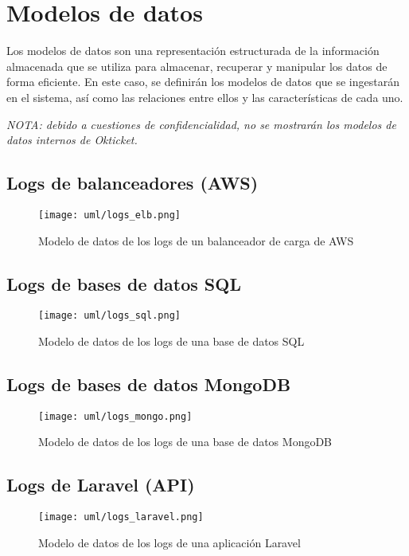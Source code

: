 \section{Modelos de datos}\label{sec:modelo}
Los modelos de datos son una representación estructurada de la información
almacenada que se utiliza para almacenar, recuperar y manipular los datos de
forma eficiente. En este caso, se definirán los modelos de datos que se
ingestarán en el sistema, así como las relaciones entre ellos y las
características de cada uno.

\emph{NOTA: debido a cuestiones de confidencialidad, no se mostrarán los modelos
de datos internos de Okticket.}

\subsection{Logs de balanceadores (AWS)}
\begin{figure}[H]
	\centering
	\texttt{[image: uml/logs\_elb.png]}
	\caption{Modelo de datos de los logs de un balanceador de carga de AWS}
	\label{fig:logs_elb}
\end{figure}


\newpage{}
\subsection{Logs de bases de datos SQL}
\begin{figure}[H]
	\centering
	\texttt{[image: uml/logs\_sql.png]}
	\caption{Modelo de datos de los logs de una base de datos SQL}
	\label{fig:logs_sql}
\end{figure}


\newpage{}
\subsection{Logs de bases de datos MongoDB}
\begin{figure}[H]
	\centering
	\texttt{[image: uml/logs\_mongo.png]}
	\caption{Modelo de datos de los logs de una base de datos MongoDB}
	\label{fig:logs_mongo}
\end{figure}


\newpage{}
\subsection{Logs de Laravel (API)}
\begin{figure}[H]
	\centering
	\texttt{[image: uml/logs\_laravel.png]}
	\caption{Modelo de datos de los logs de una aplicación Laravel}
	\label{fig:logs_laravel}
\end{figure}
